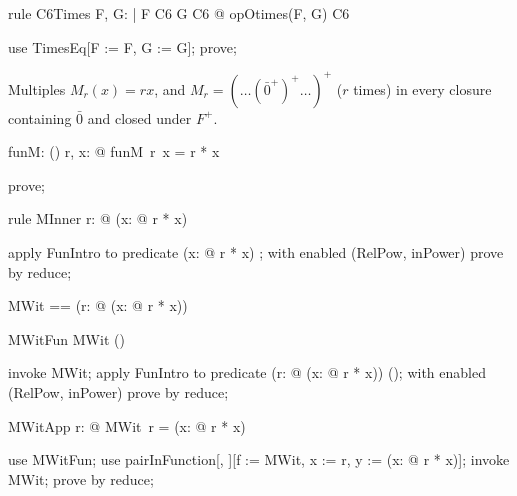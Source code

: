 \documentclass{article}
\begin{document}
\begin{theorem}{rule C6Times}
  \forall F, G: \nat \fun \nat | F \in C6 \land G \in C6 @ opOtimes(F, G) \in C6
\end{theorem}

\begin{zproof}
use TimesEq[F := F, G := G];
prove;
\end{zproof}

Multiples $M_r(x) = r x$, and $M_r = (\dots(\bar 0^+)^+\dots)^+$ ($r$ times) in every closure
containing $\bar 0$ and closed under $F^+$.

\begin{axdef}
  funM: \nat \fun (\nat \fun \nat)
\where
   \forall r, x: \nat @ funM~r~x = r * x
\end{axdef}

\begin{zproof}
prove;
\end{zproof}

\begin{theorem}{rule MInner}
  \forall r: \nat @ (\lambda x: \nat @ r * x) \in \nat \fun \nat
\end{theorem}

\begin{zproof}
apply FunIntro to predicate (\lambda x: \nat @ r * x) \in \nat \fun \nat;
with enabled (RelPow, inPower) prove by reduce;
\end{zproof}

\begin{zed}
  MWit == (\lambda r: \nat @ (\lambda x: \nat @ r * x))
\end{zed}

\begin{theorem}{MWitFun}
  MWit \in \nat \fun (\nat \fun \nat)
\end{theorem}

\begin{zproof}
invoke MWit;
apply FunIntro to predicate (\lambda r: \nat @ (\lambda x: \nat @ r * x)) \in \nat \fun (\nat \fun \nat);
with enabled (RelPow, inPower) prove by reduce;
\end{zproof}

\begin{theorem}{MWitApp}
  \forall r: \nat @ MWit~r = (\lambda x: \nat @ r * x)
\end{theorem}

\begin{zproof}
use MWitFun;
use pairInFunction[\nat, \nat \fun \nat][f := MWit, x := r, y := (\lambda x: \nat @ r * x)];
invoke MWit;
prove by reduce;
\end{zproof}
\end{document}
